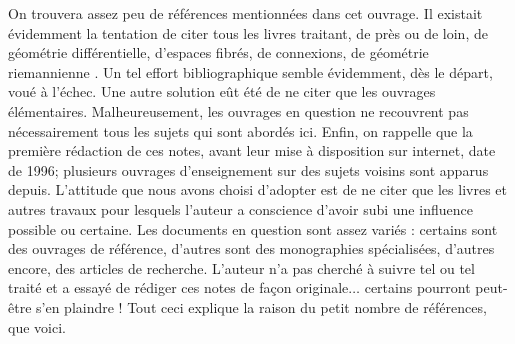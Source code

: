 On trouvera assez peu de r\'ef\'erences mentionn\'ees dans
cet ouvrage. Il existait \'evidemment la tentation de citer tous les
livres traitant, de pr\`es ou de loin, de g\'eom\'etrie diff\'erentielle,
d'espaces fibr\'es, de connexions, de  g\'eom\'etrie riemannienne \etc.
Un tel effort bibliographique semble \'evidemment, d\`es le d\'epart, vou\'e \`a
l'\'echec. Une autre solution e\^ut \'et\'e de ne citer que les ouvrages
\'el\'ementaires. Malheureusement, les ouvrages en question
 ne recouvrent pas
 n\'ecessairement tous les sujets qui sont abord\'es ici.
 Enfin, on rappelle que la premi\`ere r\'edaction de ces notes, avant leur mise \`a disposition sur internet, date de 1996; 
 plusieurs ouvrages d'enseignement sur des sujets voisins sont apparus depuis.
 L'attitude que nous avons choisi d'adopter est de ne citer que les livres
 et autres travaux pour lesquels l'auteur a conscience d'avoir subi
 une influence possible ou certaine. 
 Les documents en question sont assez vari\'es :
 certains sont des ouvrages de r\'ef\'erence, d'autres sont des 
 monographies sp\'ecialis\'ees, d'autres encore, des articles de recherche.
 L'auteur n'a pas cherch\'e \`a suivre tel ou tel trait\'e et a essay\'e de r\'ediger
 ces notes de fa\c con originale$\ldots$ certains pourront peut-\^etre s'en plaindre !
 Tout ceci explique la raison du petit nombre de r\'ef\'erences, que voici. 

\vfill\eject




